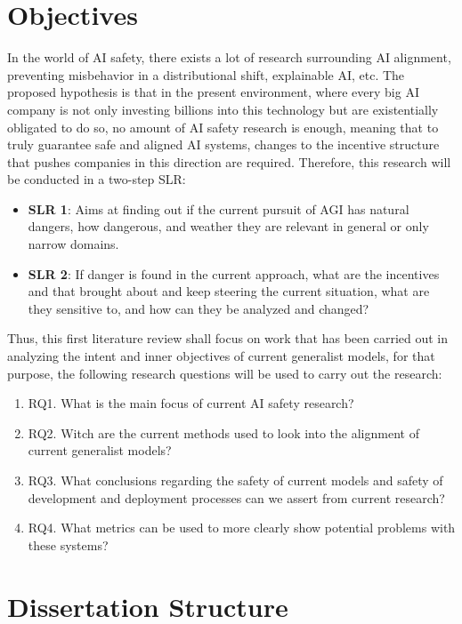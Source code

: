 \section{Objectives}

In the world of AI safety, there exists a lot of research surrounding AI alignment, preventing misbehavior in a distributional shift, explainable AI, etc. The proposed hypothesis is that in the present environment, where every big AI company is not only investing billions into this technology but are existentially obligated to do so, no amount of AI safety research is enough, meaning that to truly guarantee safe and aligned AI systems, changes to the incentive structure that pushes companies in this direction are required. Therefore, this research will be conducted in a two-step SLR:
\begin{itemize}
    \item \textbf{SLR 1}: Aims at finding out if the current pursuit of AGI has natural dangers, how dangerous, and weather they are relevant in general or only narrow domains.
    \item \textbf{SLR 2}: If danger is found in the current approach, what are the incentives and that brought about and keep steering the current situation, what are they sensitive to, and how can they be analyzed and changed?
\end{itemize}

Thus, this first literature review shall focus on work that has been carried out in analyzing the intent and inner objectives of current generalist models, for that purpose, the following research questions will be used to carry out the research:

\begin{enumerate}
    \item RQ1. What is the main focus of current AI safety research?  
    \item RQ2. Witch are the current methods used to look into the alignment of current generalist models?
    \item RQ3. What conclusions regarding the safety of current models and safety of development and deployment processes can we assert from current research?
    \item RQ4. What metrics can be used to more clearly show potential problems with these systems? 
\end{enumerate}

\section{Dissertation Structure}

\newpage